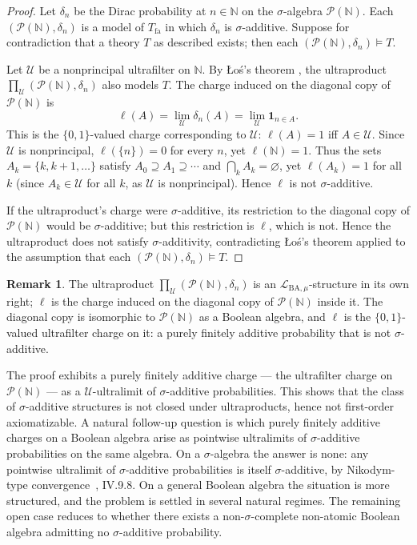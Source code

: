 \documentclass[11pt]{article}
\theoremstyle{definition}
\newtheorem{remark}[proposition]{Remark}
\newcommand{\Lmu}{\mathcal{L}_{\mathrm{BA},\mu}}
\newcommand{\Tfa}{T_{\mathrm{fa}}}
\newcommand{\N}{\mathbb{N}}
\begin{document}
\begin{proof}
Let $\delta_n$ be the Dirac probability at $n \in \N$ on the $\sigma$-algebra
$\mathcal{P}(\N)$.  Each $(\mathcal{P}(\N), \delta_n)$ is a model of $\Tfa$ in
which $\delta_n$ is $\sigma$-additive.  Suppose for contradiction that a theory
$T$ as described exists; then each $(\mathcal{P}(\N), \delta_n) \models T$.

Let $\mathcal{U}$ be a nonprincipal ultrafilter on $\N$.  By \L{}o\'{s}'s
theorem \cite{Los1955}, the ultraproduct
$\prod_\mathcal{U}(\mathcal{P}(\N),\delta_n)$ also models $T$.  The charge
induced on the diagonal copy of $\mathcal{P}(\N)$ is
\[
  \ell(A) = \lim_\mathcal{U} \delta_n(A) = \lim_\mathcal{U} \mathbf{1}_{n \in A}.
\]
This is the $\{0,1\}$-valued charge corresponding to $\mathcal{U}$: $\ell(A) = 1$
iff $A \in \mathcal{U}$.  Since $\mathcal{U}$ is nonprincipal, $\ell(\{n\}) = 0$
for every $n$, yet $\ell(\N) = 1$.  Thus the sets $A_k = \{k, k+1, \ldots\}$
satisfy $A_0 \supseteq A_1 \supseteq \cdots$ and $\bigcap_k A_k = \varnothing$,
yet $\ell(A_k) = 1$ for all $k$ (since $A_k \in \mathcal{U}$ for all $k$, as
$\mathcal{U}$ is nonprincipal).  Hence $\ell$ is not $\sigma$-additive.

If the ultraproduct's charge were $\sigma$-additive, its restriction to the
diagonal copy of $\mathcal{P}(\N)$ would be $\sigma$-additive; but this
restriction is $\ell$, which is not.  Hence the ultraproduct does not satisfy
$\sigma$-additivity, contradicting \L{}o\'{s}'s theorem applied to the
assumption that each $(\mathcal{P}(\N), \delta_n) \models T$.
\end{proof}

\begin{remark}
The ultraproduct $\prod_\mathcal{U}(\mathcal{P}(\N),\delta_n)$ is an
$\Lmu$-structure in its own right; $\ell$ is the charge induced on the diagonal
copy of $\mathcal{P}(\N)$ inside it.  The diagonal copy is isomorphic to
$\mathcal{P}(\N)$ as a Boolean algebra, and $\ell$ is the $\{0,1\}$-valued
ultrafilter charge on it: a purely finitely additive probability that is not
$\sigma$-additive.
\end{remark}

\medskip

The proof exhibits a purely finitely additive charge --- the ultrafilter charge on
$\mathcal{P}(\N)$ --- as a $\mathcal{U}$-ultralimit of $\sigma$-additive
probabilities.  This shows that the class of $\sigma$-additive structures is not
closed under ultraproducts, hence not first-order axiomatizable.  A natural
follow-up question is which purely finitely additive charges on a Boolean algebra
arise as pointwise ultralimits of $\sigma$-additive probabilities on the same
algebra.  On a $\sigma$-algebra the answer is none: any pointwise ultralimit of
$\sigma$-additive probabilities is itself $\sigma$-additive, by Nikodym-type
convergence~\cite{DunfordSchwartz1958}, IV.9.8.  On a general Boolean algebra the
situation is more structured, and the problem is settled in several natural regimes.
The remaining open case reduces to whether there exists a non-$\sigma$-complete
non-atomic Boolean algebra admitting no $\sigma$-additive probability.



\end{document}

